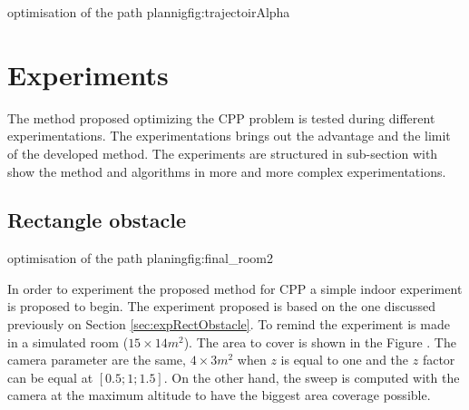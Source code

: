  \begin{mfigures}[!]{optimisation of the path plannig}{fig:trajectoirAlpha} \centering
{}
\end{mfigures} 
	
	
				



			\section{Experiments} \label{sec:experiment}

The method proposed optimizing the CPP problem is tested during different experimentations. The experimentations brings out the advantage and the limit of the developed method. The experiments are structured in sub-section with show the method and algorithms in more and more complex experimentations.

\subsection{Rectangle obstacle} \label{experiment}

 \begin{mfigures}[!]{optimisation of the path planing}{fig:final_room2} \centering
\hspace{1cm}

\tabsVrepPath
\end{mfigures} 

In order to experiment the proposed method for CPP a simple indoor experiment is proposed to begin.
The experiment proposed is based on the one discussed previously on Section \ref{sec:expRectObstacle}.
To remind the experiment is made in a simulated room ($15 \times 14 m^2$). The area to cover is shown in the Figure . The camera parameter are the same, $4 \times 3 m^2$ when $z$ is equal to one and the $z$ factor can be equal at $[0.5;1;1.5]$. On the other hand, the sweep is computed with the camera at the maximum altitude to have the biggest area coverage possible.

